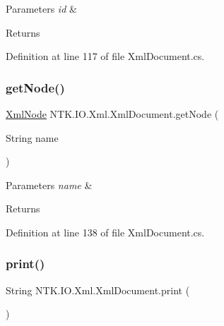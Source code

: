 \begin{DoxyParams}{Parameters}
{\em id} & \\
\hline
\end{DoxyParams}
\begin{DoxyReturn}{Returns}

\end{DoxyReturn}


Definition at line 117 of file Xml\+Document.\+cs.

\mbox{\label{class_n_t_k_1_1_i_o_1_1_xml_1_1_xml_document_aef6f8f86ec604204c7e70d21d6f53b32}} 
\subsubsection{\texorpdfstring{getNode()}{getNode()}\hspace{0.1cm}{\footnotesize\ttfamily [3/3]}}
{\footnotesize\ttfamily \mbox{\hyperlink{class_n_t_k_1_1_i_o_1_1_xml_1_1_xml_node}{Xml\+Node}} N\+T\+K.\+I\+O.\+Xml.\+Xml\+Document.\+get\+Node (\begin{DoxyParamCaption}\item[{String}]{name }\end{DoxyParamCaption})}






\begin{DoxyParams}{Parameters}
{\em name} & \\
\hline
\end{DoxyParams}
\begin{DoxyReturn}{Returns}

\end{DoxyReturn}


Definition at line 138 of file Xml\+Document.\+cs.

\mbox{\label{class_n_t_k_1_1_i_o_1_1_xml_1_1_xml_document_a792b1652215b4c10a8a3fd7e551ffcac}} 
\subsubsection{\texorpdfstring{print()}{print()}}
{\footnotesize\ttfamily String N\+T\+K.\+I\+O.\+Xml.\+Xml\+Document.\+print (\begin{DoxyParamCaption}{ }\end{DoxyParamCaption})}





